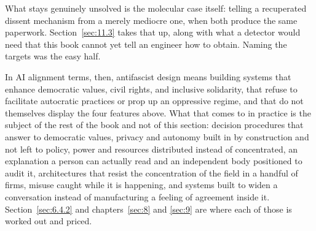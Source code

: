 What stays genuinely unsolved is the molecular case itself: telling a recuperated dissent mechanism from a merely mediocre one, when both produce the same paperwork. Section~\ref{sec:11.3} takes that up, along with what a detector would need that this book cannot yet tell an engineer how to obtain. Naming the targets was the easy half.

In AI alignment terms, then, antifascist design means building systems that enhance democratic values, civil rights, and inclusive solidarity, that refuse to facilitate autocratic practices or prop up an oppressive regime, and that do not themselves display the four features above. What that comes to in practice is the subject of the rest of the book and not of this section: decision procedures that answer to democratic values, privacy and autonomy built in by construction and not left to policy, power and resources distributed instead of concentrated, an explanation a person can actually read and an independent body positioned to audit it, architectures that resist the concentration of the field in a handful of firms, misuse caught while it is happening, and systems built to widen a conversation instead of manufacturing a feeling of agreement inside it. Section~\ref{sec:6.4.2} and chapters~\ref{sec:8} and \ref{sec:9} are where each of those is worked out and priced.

